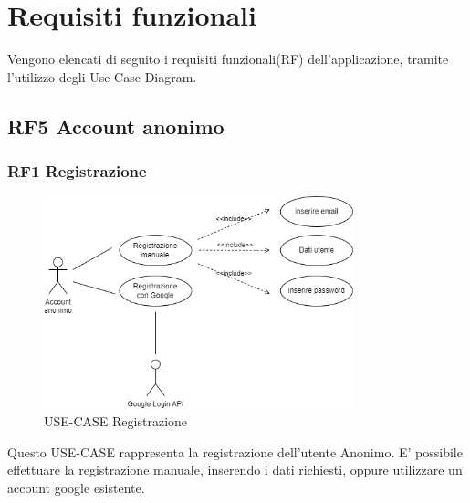 \documentclass[a4paper,12pt]{article}
\begin{document}
\newpage

\section{Requisiti funzionali}

Vengono elencati di seguito i requisiti funzionali(RF) dell'applicazione, tramite l'utilizzo degli Use Case Diagram.

\subsection*{RF5 Account anonimo}

\subsubsection*{RF1 Registrazione}
\begin{figure}[H]
   \centering
    \includegraphics[width=0.8\textwidth]{img/registrazione_anonimo.png}
    \caption{USE-CASE Registrazione}
\end{figure}

Questo USE-CASE rappresenta la registrazione dell'utente Anonimo.
E' possibile effettuare la registrazione manuale, inserendo i dati richiesti, oppure utilizzare un account google esistente.
\end{document}
